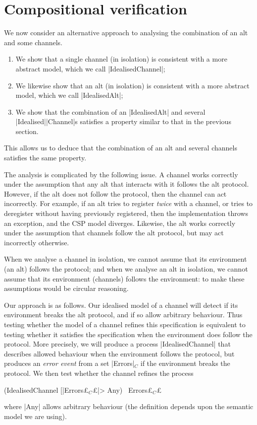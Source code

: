 \section{Compositional verification}
\label{sec:compositional}

\inlineCSP

We now consider an alternative approach to analysing the combination of an alt
and some channels.
%
\begin{enumerate}
\item We show that a single channel (in isolation) is consistent with a more
  abstract model, which we call |IdealisedChannel|;

\item We likewise show that an alt (in isolation) is consistent with a more
  abstract model, which we call |IdealisedAlt|;

\item We show that the combination of an |IdealisedAlt| and several
  |Idealised|\-|Channel|s satisfies a property similar to that in the previous
  section. 
\end{enumerate}
%
This allows us to deduce that the combination of an alt and several channels
satisfies the same property. 

The analysis is complicated by the following issue.  A channel works correctly
under the assumption that any alt that interacts with it follows the alt
protocol.  However, if the alt does not follow the protocol, then the channel
can act incorrectly.  For example, if an alt tries to register \emph{twice}
with a channel, or tries to deregister without having previously registered,
then the implementation throws an exception, and the CSP model diverges.
Likewise, the alt works correctly under the assumption that channels follow
the alt protocol, but may act incorrectly otherwise.

When we analyse a channel in isolation, we cannot assume that its environment
(an alt) follows the protocol; and when we analyse an alt in isolation, we
cannot assume that its environment (channels) follows the environment: to make
these assumptions would be circular reasoning. 

Our approach is as follows.  Our idealised model of a channel will detect if
its environment breaks the alt protocol, and if so allow arbitrary behaviour.
Thus testing whether the model of a channel refines this specification is
equivalent to testing whether it satisfies the specification when the
environment does follow the protocol.  More precisely, we will produce a
process |IdealisedChannel| that describes allowed behaviour when the environment
follows the protocol, but produces an \emph{error event} from a set
|Errors|$_C$ if the environment breaks the protocol.  We then test whether the
channel refines the process
%
\begin{cspm}
(IdealisedChannel [|Errors£$_C$£|> Any) \ Errors£$_C$£
\end{cspm}
%
where |Any| allows arbitrary behaviour (the definition depends upon the
semantic model we are using).  

